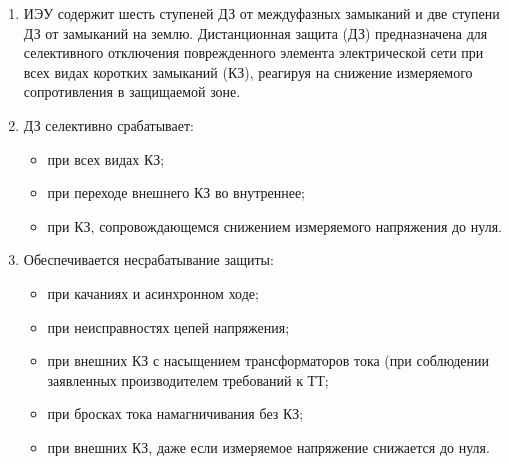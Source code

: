 \color{black}

\begin{enumerate}[label=\arabic{section}.\arabic{subsection}.\arabic*,  align=left, labelsep=4pt, leftmargin=0pt, itemindent=57pt]

\item
ИЭУ содержит шесть ступеней ДЗ от междуфазных замыканий и две ступени ДЗ от замыканий на
землю. Дистанционная  защита  (ДЗ)  предназначена  для  селективного  отключения  поврежденного  элемента
электрической  сети  при  всех видах  коротких  замыканий (КЗ),  реагируя  на снижение измеряемого
сопротивления в защищаемой зоне.

\item 
ДЗ селективно срабатывает:
\begin{itemize}
    \item при всех видах КЗ; 
    \item при переходе внешнего КЗ во внутреннее; 
    \item при КЗ, сопровождающемся снижением измеряемого напряжения до нуля.
\end{itemize}

\item 
Обеспечивается несрабатывание защиты:
\begin{itemize} 
\item при качаниях и асинхронном ходе; 
\item при неисправностях цепей напряжения;
\item при внешних КЗ с насыщением трансформаторов тока (при соблюдении заявленных производителем требований к ТТ; 
\item при бросках тока намагничивания без КЗ;
\item при внешних КЗ, даже если измеряемое напряжение снижается до нуля.
\end{itemize}


\end{enumerate}
